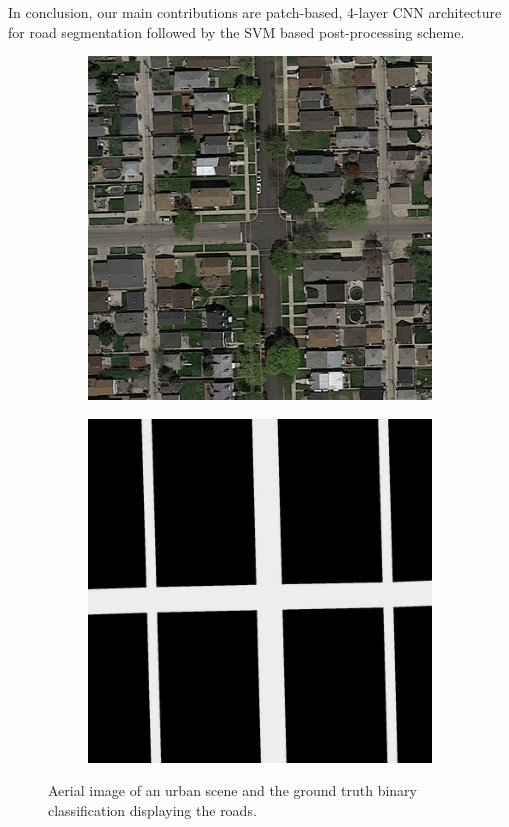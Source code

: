 \documentclass[10pt,conference,compsocconf]{IEEEtran}
\begin{document}
In conclusion, our main contributions are patch-based, \mbox{4-layer} CNN architecture for road segmentation followed by the SVM based post-processing scheme. 

\begin{figure}[]
	\label{fig:intro_example}
	\centering
	\begin{subfigure}{.2\textwidth}
		\includegraphics[width=1\textwidth]{figs/img1.png}
	\end{subfigure}
	\begin{subfigure}{.2\textwidth}
		\includegraphics[width=1\textwidth]{figs/groundtruth1.png}
	\end{subfigure}
	\caption{Aerial image of an urban scene and the ground truth binary classification displaying the roads.}
\end{figure}
\end{document}

